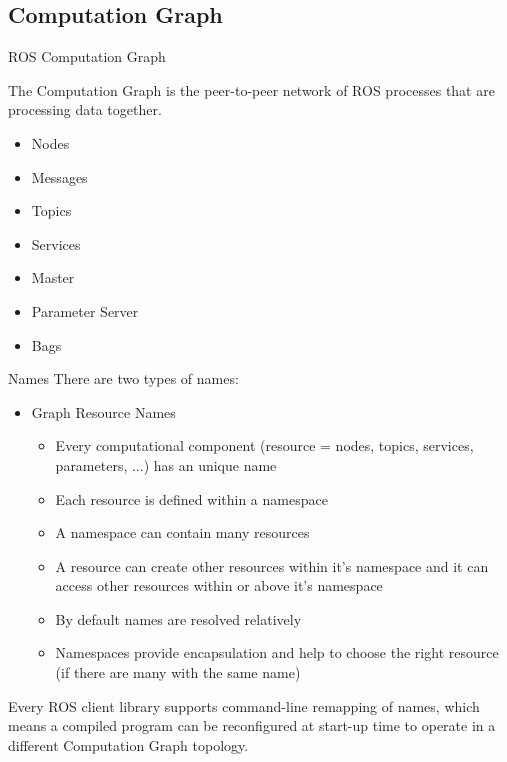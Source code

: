 \documentclass{beamer}
\begin{document}

\subsection{Computation Graph}

\begin{frame}{ROS Computation Graph}	
	
	\large{The Computation Graph is the peer-to-peer network of ROS processes that are processing data together.}
	
	\begin{itemize}
		\item Nodes
		\item Messages
		\item Topics
		\item Services
		\item Master
		\item Parameter Server
		\item Bags
	\end{itemize}
	
\end{frame}

\begin{frame}{Names}
	There are two types of names:
	
	\begin{itemize}
		\item Graph Resource Names
		
			\begin{itemize}
				\item Every computational component (resource = nodes, topics, services, parameters, ...) has an unique name
				\item Each resource is defined within a namespace
				\item A namespace can contain many resources
				\item A resource can create other resources within it's namespace and 
				it can access other resources within or above it's namespace
				\item By default names are resolved relatively
				\item Namespaces provide encapsulation and help to choose the right resource (if there are many with the same name)
			\end{itemize}
		
	\end{itemize}
	
	Every ROS client library supports command-line remapping of names, which means a compiled program can be reconfigured at start-up time to operate in a different Computation Graph topology.
	
\end{frame}
\end{document}

